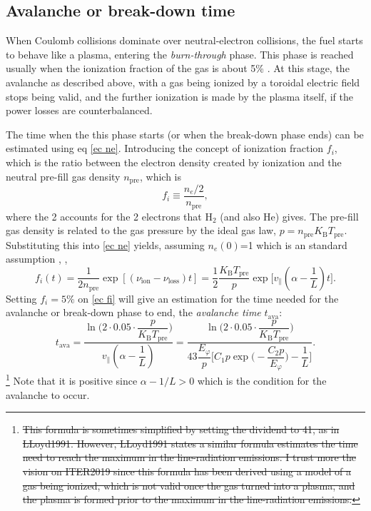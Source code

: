\documentclass[a4paper,12pt,oneside]{book}
\begin{document}

\subsection{Avalanche or break-down time}

When Coulomb collisions dominate over neutral-electron collisions, the fuel starts to behave like a plasma, entering the \textit{burn-through} phase. This phase is reached usually when the ionization fraction of the gas is about 5\% \cite{ITER_2019}. At this stage, the avalanche as described above, with a gas being ionized by a toroidal electric field stops being valid, and the further ionization is made by the plasma itself, if the power losses are counterbalanced. 

The time when the this phase starts (or when the break-down phase ends) can be estimated using eq \eqref{ec ne}. Introducing the concept of ionization fraction $f_i$, which is the ratio between the electron density created by ionization and the neutral pre-fill gas density $n_\text{pre}$, which is
%
\begin{equation}
f_i \equiv \dfrac{n_e/2}{n_\text{pre}},
\end{equation} 
where the 2 accounts for the 2 electrons that H$_2$ (and also He) gives. The pre-fill gas density is related to the gas pressure by the ideal gas law, $p=n_\text{pre} K_\text{B} T_\text{pre}$. Substituting this into \eqref{ec ne} yields, assuming $n_e(0)$=1 which is an standard assumption \cite{ITER_2019}, \cite{Lloyd_1991},
%
\begin{equation}\label{ec fi}
f_i(t)=\dfrac{1}{2 n_\text{pre}} \exp{ [(\nu_\text{ion}-\nu_\text{loss})t]}= \dfrac{1}{2} \dfrac{K_\text{B} T_\text{pre}}{p} \exp \Big[v_\parallel (\alpha-\dfrac{1}{L})t \Big].
\end{equation}
Setting $f_i=5\%$ on \eqref{ec fi} will give an estimation for the time needed for the avalanche or break-down phase to end, the \textit{avalanche time} $t_\text{ava}$:
%
\begin{equation}\label{ec t_ava}
t_\text{ava}= \dfrac{\ln \Big(2\cdot 0.05 \cdot \dfrac{p}{K_\text{B} T_\text{pre}} \Big) }{v_\parallel (\alpha-\dfrac{1}{L})}=\dfrac{\ln \Big(2\cdot 0.05 \cdot \dfrac{p}{K_\text{B} T_\text{pre}} \Big) }{43 \dfrac{E_\varphi}{p}\Big[ C_1 p \exp \Big(-\dfrac{C_2 p}{E_\varphi} \Big)-\dfrac{1}{L} \Big]}.
\end{equation}\footnote{\st{This formula is sometimes simplified by setting the dividend to 41, as in LLoyd1991. However, LLoyd1991 states a similar formula estimates the time need to reach the maximum in the line-radiation emissions. I trust more the vision on ITER2019 since this formula has been derived using a model of a gas being ionized, which is not valid once the gas turned into a plasma, and the plasma is formed prior to the maximum in the line-radiation emissions.}}
Note that it is positive since $\alpha-1/L>0$ which is the condition for the avalanche to occur.
\end{document}

